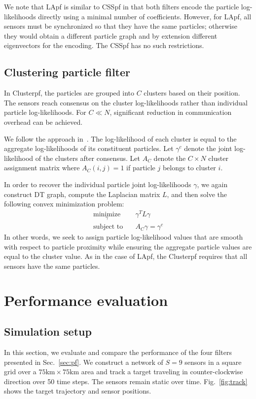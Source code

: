 \documentclass[10pt,letterpaper,final]{article}
\begin{document}
We note that LApf is similar to CSSpf in that both filters encode the particle log-likelihoods directly using a minimal number of coefficients. However, for LApf, all sensors must be synchronized so that they have the same particles; otherwise they would obtain a different particle graph and by extension different eigenvectors for the encoding. The CSSpf has no such restrictions. 

\subsection{Clustering particle filter}
In Clusterpf, the particles are grouped into $C$ clusters based on their position. The sensors reach consensus on the cluster log-likelihoods rather than individual particle log-likelihoods. For $C \ll N$, significant reduction in communication overhead can be achieved. 

We follow the approach in~\cite{Hlinka2012}. The log-likelihood of each cluster is equal to the aggregate log-likelihoods of its constituent particles. Let $\gamma^c$ denote the joint log-likelihood of the clusters after consensus. Let $A_C$ denote the $C \times N$ cluster assignment matrix where $A_C(i,j)=1$ if particle $j$ belongs to cluster $i$. 

In order to recover the individual particle joint log-likelihoods $\gamma$, we again construct DT graph, compute the Laplacian matrix $L$, and then solve the following convex minimization problem:
\begin{align}
\underset{\gamma}{\text{minimize}}& \quad \gamma^TL\gamma  \\
\text{subject to}& \quad A_C\gamma = \gamma^c
\end{align}
In other words, we seek to assign particle log-likelihood values that are smooth with respect to particle proximity while ensuring the aggregate particle values are equal to the cluster value. As in the case of LApf, the Clusterpf requires that all sensors have the same particles. 

\section{Performance evaluation}
\label{sec:evaluation}
\subsection{Simulation setup}
In this section, we evaluate and compare the performance of the four filters presented in Sec.~\ref{sec:pf}. We construct a network of $S=9$ sensors in a square grid over a $75\text{km} \times 75\text{km}$ area and track a target traveling in counter-clockwise direction over 50 time steps. The sensors remain static over time. Fig.~\ref{fig:track} shows the target trajectory and sensor positions. 
\end{document}

